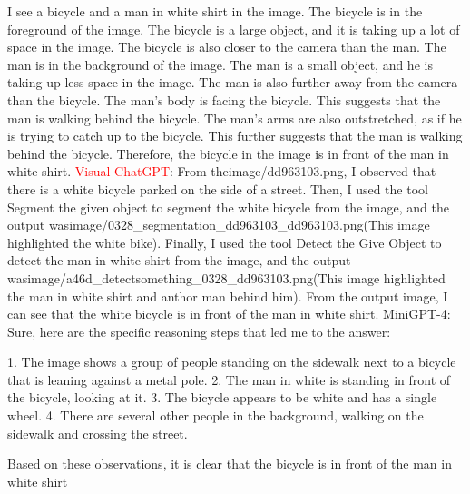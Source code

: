 \begin{enumerate}
    I see a bicycle and a man in white shirt in the image.
    The bicycle is in the foreground of the image. The bicycle is a large object, and it is taking up a lot of space in the image. The bicycle is also closer to the camera than the man.
    The man is in the background of the image. The man is a small object, and he is taking up less space in the image. The man is also further away from the camera than the bicycle.
    The man's body is facing the bicycle. This suggests that the man is walking behind the bicycle.
    The man's arms are also outstretched, as if he is trying to catch up to the bicycle. This further suggests that the man is walking behind the bicycle.
    Therefore, the bicycle in the image is in front of the man in white shirt.
    \subitem \textcolor{red}{Visual ChatGPT}: From theimage/dd963103.png, I observed that there is a white bicycle parked on the side of a street. Then, I used the tool Segment the given object to segment the white bicycle from the image, and the output wasimage/0328\_segmentation\_dd963103\_dd963103.png(This image highlighted the white bike). Finally, I used the tool Detect the Give Object to detect the man in white shirt from the image, and the output wasimage/a46d\_detect\-something\_0328\_dd963103.png(This image highlighted the man in white shirt and anthor man behind him). From the output image, I can see that the white bicycle is in front of the man in white shirt.
    \subitem MiniGPT-4: Sure, here are the specific reasoning steps that led me to the answer:

    1. The image shows a group of people standing on the sidewalk next to a bicycle that is leaning against a metal pole.
    2. The man in white is standing in front of the bicycle, looking at it.
    3. The bicycle appears to be white and has a single wheel.
    4. There are several other people in the background, walking on the sidewalk and crossing the street.
    
    Based on these observations, it is clear that the bicycle is in front of the man in white shirt
\end{enumerate}

